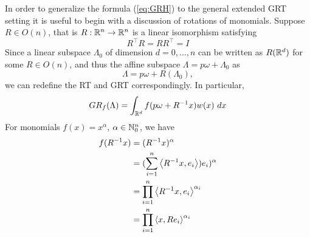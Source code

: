 In order to generalize the formula (\ref{eq:GRH}) to the general extended GRT setting it is useful to begin with a discussion of rotations of monomials. Suppose $R \in O(n)$, that is $R : \mathbb{R}^n \to \mathbb{R}^n$ is a linear isomorphism satisfying
\[
  R^\top R = RR^\top = I
\]
Since a linear subspace $\Lambda_0$ of dimension $d = 0, \ldots, n$ can be written as $R(\mathbb{R}^d)$ for some $R \in O(n)$, and thus the affine subspace $\Lambda = p\omega + \Lambda_0$ as
\[
  \Lambda = p\omega + R(\Lambda_0),
\]
we can redefine the RT and GRT correspondingly. In particular,
\[
  GR_f(\Lambda) = \int_{\mathbb{R}^d} f(p\omega + R^{-1}x)w(x)~dx
\]
For monomials $f(x) = x^\alpha$, $\alpha \in \mathbb{N}_0^n$, we have
\begin{align*}
  f(R^{-1}x) 
    &= (R^{-1}x)^\alpha
    \\ 
    &= (\sum_{i = 1}^n \left\langle R^{-1}x, e_i \right\rangle)e_i)^\alpha
    \\
    &= \prod_{i = 1}^n \left\langle R^{-1}x, e_i \right\rangle^{\alpha_i}
    \\
    &= \prod_{i = 1}^n \left\langle x, Re_i \right\rangle^{\alpha_i}
\end{align*}

